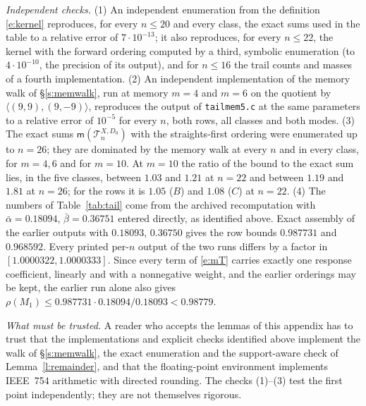 \emph{Independent checks.} (1) An independent enumeration from the definition \eqref{e:kernel} reproduces, for every $n \le 20$ and every class, the exact sums used in the table to a relative error of $7 \cdot 10^{-13}$; it also reproduces, for every $n \le 22$, the kernel with the forward ordering computed by a third, symbolic enumeration (to $4 \cdot 10^{-10}$, the precision of its output), and for $n \le 16$ the trail counts and masses of a fourth implementation. (2) An independent implementation of the memory walk of \S\ref{s:memwalk}, run at memory $m = 4$ and $m = 6$ on the quotient by $\langle (9, 9), (9, -9) \rangle$, reproduces the output of \texttt{tailmem5.c} at the same parameters to a relative error of $10^{-5}$ for every $n$, both rows, all classes and both modes. (3) The exact sums $\mathsf m(\mathcal T^{X, D_0}_n)$ with the straights-first ordering were enumerated up to $n = 26$; they are dominated by the memory walk at every $n$ and in every class, for $m = 4, 6$ and for $m = 10$. At $m = 10$ the ratio of the bound to the exact sum lies, in the five classes, between $1.03$ and $1.21$ at $n = 22$ and between $1.19$ and $1.81$ at $n = 26$; for the rows it is $1.05$ ($B$) and $1.08$ ($C$) at $n = 22$. (4) The numbers of Table~\ref{tab:tail} come from the archived recomputation with
$\bar\alpha=0.18094$, $\bar\beta=0.36751$ entered directly, as identified above.
Exact assembly of the earlier outputs with $0.18093$, $0.36750$ gives the row bounds
$0.987731$ and $0.968592$.
Every printed per-$n$ output of the two runs differs by a factor in
$[1.0000322,1.0000333]$.
Since every term of \eqref{e:mT} carries exactly one response coefficient, linearly and with a nonnegative weight,
and the earlier orderings may be kept, the earlier run alone also gives
$\rho(M_1)\le0.987731\cdot0.18094/0.18093<0.98779$.

\emph{What must be trusted.} A reader who accepts the lemmas of this appendix has to trust that the implementations and explicit checks identified above implement the walk of \S\ref{s:memwalk}, the exact enumeration and the support-aware check of Lemma~\ref{l:remainder}, and that the floating-point environment implements IEEE~754 arithmetic with directed rounding. The checks (1)--(3) test the first point independently; they are not themselves rigorous.

